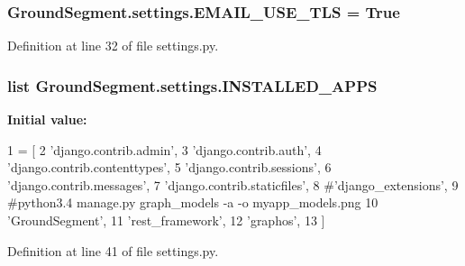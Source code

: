 \subsubsection[{E\+M\+A\+I\+L\+\_\+\+U\+S\+E\+\_\+\+T\+L\+S}]{\setlength{\rightskip}{0pt plus 5cm}Ground\+Segment.\+settings.\+E\+M\+A\+I\+L\+\_\+\+U\+S\+E\+\_\+\+T\+L\+S = True}\label{namespace_ground_segment_1_1settings_a8f145226f6aaa8becf7066ef790b389b}


Definition at line 32 of file settings.\+py.

\hypertarget{namespace_ground_segment_1_1settings_a87e988a27e0909411e0d3111b409f128}{}
\subsubsection[{I\+N\+S\+T\+A\+L\+L\+E\+D\+\_\+\+A\+P\+P\+S}]{\setlength{\rightskip}{0pt plus 5cm}list Ground\+Segment.\+settings.\+I\+N\+S\+T\+A\+L\+L\+E\+D\+\_\+\+A\+P\+P\+S}\label{namespace_ground_segment_1_1settings_a87e988a27e0909411e0d3111b409f128}
{\bfseries Initial value\+:}
\begin{DoxyCode}
1 = [
2     \textcolor{stringliteral}{'django.contrib.admin'},
3     \textcolor{stringliteral}{'django.contrib.auth'},
4     \textcolor{stringliteral}{'django.contrib.contenttypes'},
5     \textcolor{stringliteral}{'django.contrib.sessions'},
6     \textcolor{stringliteral}{'django.contrib.messages'},
7     \textcolor{stringliteral}{'django.contrib.staticfiles'},
8     \textcolor{comment}{#'django\_extensions',}
9     \textcolor{comment}{#python3.4 manage.py graph\_models -a -o myapp\_models.png}
10     \textcolor{stringliteral}{'GroundSegment'},
11     \textcolor{stringliteral}{'rest\_framework'},
12     \textcolor{stringliteral}{'graphos'},
13 ]
\end{DoxyCode}


Definition at line 41 of file settings.\+py.

\hypertarget{namespace_ground_segment_1_1settings_ad00a75a321dcbd00ef2dc2d0181ea4bb}{}
